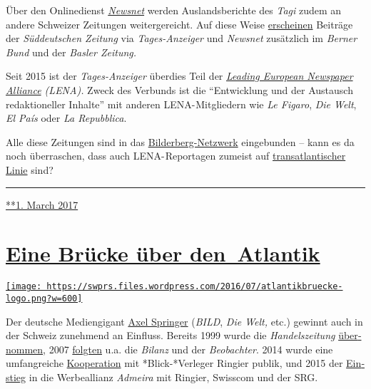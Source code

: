 Über den Onlinedienst
\emph{\href{https://de.wikipedia.org/wiki/Newsnet}{Newsnet}} werden
Aus­lands­be­rich­te des \emph{Tagi} zudem an andere Schwei­zer
Zei­tungen wei­ter­ge­reicht. Auf diese Weise
\href{http://www.tagesanzeiger.ch/ausland/europa/Den-Ausloeser-zum-Krieg-habe-ich-gedrueckt/story/16330278}{er­scheinen}
Beiträge der \emph{Süd­deutschen Zeitung} via \emph{Tages­-Anzeiger} und
\emph{Newsnet} zu­sätz­lich im \emph{Berner Bund} und der \emph{Basler
Zeitung.}

Seit 2015 ist der \emph{Tages­-Anzeiger} über­dies Teil der
\emph{\href{https://de.wikipedia.org/wiki/Leading_European_Newspaper_Alliance}{Leading
European News­paper Alliance} (LENA).} Zweck des Ver­bunds ist die
``Ent­wick­lung und der Aus­tausch re­dak­tio­neller In­hal­te'' mit
anderen LENA- Mit­glie­dern wie \emph{Le Fi­g­aro}, \emph{Die Welt},
\emph{El País} oder \emph{La Re­pub­blica}.

Alle diese Zei­tungen sind in das
\href{https://swprs.files.wordpress.com/2016/07/bilderberg_teilnehmer_1954-2014.pdf}{Bilder­berg-Netz­werk}
ein­ge­bun­den -- kann es da noch über­raschen, dass auch
LENA- Repor­ta­gen zumeist auf
\href{http://www.tagesanzeiger.ch/ausland/europa/Wer-sagt-was-er-denkt-nobrriskiert-allesnobr/story/17225010}{trans­at­lan­tischer
Linie} sind?

\begin{center}\rule{0.5\linewidth}{\linethickness}\end{center}

\href{https://swprs.org/2017/03/01/warum-der-tagesanzeiger-nichts-verpasst/}{**1.
March 2017}

\hypertarget{eine-bruxfccke-uxfcber-den-atlantik}{%
\section{\texorpdfstring{\href{https://swprs.org/2017/03/01/eine-bruecke-ueber-den-atlantik/}{Eine
Brücke über
den~Atlantik}}{Eine Brücke über den~Atlantik}}\label{eine-bruxfccke-uxfcber-den-atlantik}}

\href{https://swprs.org/2017/03/01/eine-bruecke-ueber-den-atlantik/}{\texttt{[image: https://swprs.files.wordpress.com/2016/07/atlantikbruecke-logo.png?w=600]}}

Der deutsche Medien­gigant
\href{https://de.wikipedia.org/wiki/Axel_Springer_SE}{Axel Springer}
(\emph{BILD}, \emph{Die Welt,} etc.) gewinnt auch in der Schweiz
zu­neh­mend an Einfluss. Bereits 1999 wurde die \emph{Handels­zeitung}
\href{https://de.wikipedia.org/wiki/Handelszeitung}{über­nommen}, 2007
\href{https://de.wikipedia.org/wiki/Jean_Frey_AG}{folgten} u.a. die
\emph{Bilanz} und der \emph{Beobachter}. 2014 wurde eine umfang­reiche
\href{http://www.blick.ch/news/wirtschaft/medien-ringier-und-axel-springer-gruenden-gemeinschaftsunternehmen-in-der-schweiz-id3357037.html}{Koope­ration}
mit *Blick-*Verleger Ringier publik, und 2015 der
\href{http://www.persoenlich.com/marketing/die-werbeallianz-prasentiert-sich-zum-ersten-mal-der-branche}{Ein­stieg}
in die Werbe­allianz \emph{Admeira} mit Ringier, Swiss­com und der SRG.

